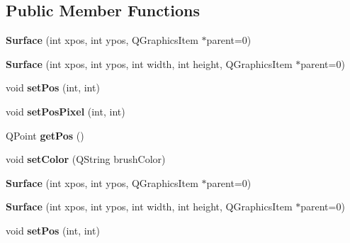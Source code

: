 \subsection*{Public Member Functions}
\begin{DoxyCompactItemize}
\item 
\hypertarget{class_surface_ac03bea7e4e17982fd17f8a571035a6f0}{}{\bfseries Surface} (int xpos, int ypos, Q\+Graphics\+Item $\ast$parent=0)\label{class_surface_ac03bea7e4e17982fd17f8a571035a6f0}

\item 
\hypertarget{class_surface_a3e1af81e4723f854196608b966a86415}{}{\bfseries Surface} (int xpos, int ypos, int width, int height, Q\+Graphics\+Item $\ast$parent=0)\label{class_surface_a3e1af81e4723f854196608b966a86415}

\item 
\hypertarget{class_surface_a025ed38853ae95be3c6fe8814711ffc3}{}void {\bfseries set\+Pos} (int, int)\label{class_surface_a025ed38853ae95be3c6fe8814711ffc3}

\item 
\hypertarget{class_surface_ab63590ebca0d813b110aa286400eac72}{}void {\bfseries set\+Pos\+Pixel} (int, int)\label{class_surface_ab63590ebca0d813b110aa286400eac72}

\item 
\hypertarget{class_surface_acbdbf91a4cca74bb9da6c8a2fa932cd7}{}Q\+Point {\bfseries get\+Pos} ()\label{class_surface_acbdbf91a4cca74bb9da6c8a2fa932cd7}

\item 
\hypertarget{class_surface_ab7dd076ec71f2d6a63fe60f6c011786b}{}void {\bfseries set\+Color} (Q\+String brush\+Color)\label{class_surface_ab7dd076ec71f2d6a63fe60f6c011786b}

\item 
\hypertarget{class_surface_ac03bea7e4e17982fd17f8a571035a6f0}{}{\bfseries Surface} (int xpos, int ypos, Q\+Graphics\+Item $\ast$parent=0)\label{class_surface_ac03bea7e4e17982fd17f8a571035a6f0}

\item 
\hypertarget{class_surface_a3e1af81e4723f854196608b966a86415}{}{\bfseries Surface} (int xpos, int ypos, int width, int height, Q\+Graphics\+Item $\ast$parent=0)\label{class_surface_a3e1af81e4723f854196608b966a86415}

\item 
\hypertarget{class_surface_a025ed38853ae95be3c6fe8814711ffc3}{}void {\bfseries set\+Pos} (int, int)\label{class_surface_a025ed38853ae95be3c6fe8814711ffc3}


\end{DoxyCompactItemize}
